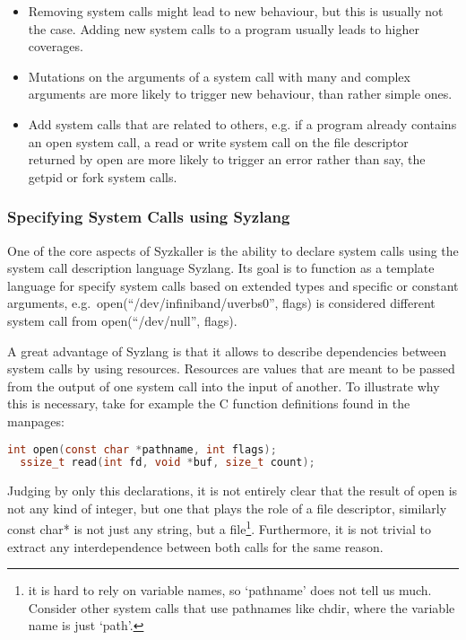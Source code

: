\begin{itemize}
  \item Removing system calls might lead to new behaviour, but this is usually not the case. Adding new system calls to a program usually leads to higher coverages.
  \item Mutations on the arguments of a  system call with many and complex arguments are more likely to trigger new behaviour, than rather simple ones.
  \item Add system calls that are related to others, e.g. if a program already contains an open system call, a read or write system call on the file descriptor returned by open are more likely to trigger an error rather than say, the getpid or fork system calls.
\end{itemize}

\subsubsection{Specifying System Calls using Syzlang}

One of the core aspects of Syzkaller is the ability to declare system calls using
the system call description language Syzlang. Its goal is to function as a template
language for specify system calls based on extended types and specific or constant arguments,
e.g.\ open(``/dev/infiniband/uverbs0'', flags) is considered different system call from open(``/dev/null'', flags).

A great advantage of Syzlang is
that it allows to describe dependencies between system calls by using resources.
Resources are values that are meant to be passed from the output of one system call
into the input of another.
To illustrate why this is necessary, take for example the C function definitions found in the manpages:

\begin{lstlisting}[caption={Manpage C definitions for open and read}, language=c]
  int open(const char *pathname, int flags);
  ssize_t read(int fd, void *buf, size_t count);
\end{lstlisting}

Judging by only this declarations, it is not entirely clear that the result of open
is not any kind of integer, but one that plays the role of a file descriptor, similarly const char* is not
just any string, but a file\footnote{it is hard to rely on variable names, so `pathname' does not tell us much. Consider other system calls that use pathnames like chdir, where the variable name is just `path'.}. Furthermore,
it is not trivial to extract any interdependence between both calls for the same reason.

